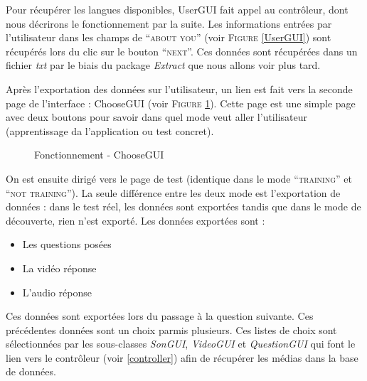Pour récupérer les langues disponibles, UserGUI fait appel au contrôleur, dont nous décrirons le fonctionnement par la suite.
Les informations entrées par l'utilisateur dans les champs de ``\textsc{about you}'' (voir \textsc{Figure} \ref{UserGUI}) sont récupérés lors du clic sur le bouton ``\textsc{next}''. Ces données sont récupérées dans un fichier \textit{txt} par le biais du package \textit{Extract} que nous allons voir plus tard.

Après l'exportation des données sur l'utilisateur, un lien est fait vers la seconde page de l'interface : ChooseGUI (voir \textsc{Figure} \ref{ChooseGUI}). Cette page est une simple page avec deux boutons pour savoir dans quel mode veut aller l'utilisateur (apprentissage da l'application ou test concret).


\begin{figure}[!ht]
\begin{center}
  \caption{Fonctionnement - ChooseGUI}
  \label{ChooseGUI} 
\end{center}
\end{figure}

On est ensuite dirigé vers le page de test (identique dans le mode ``\textsc{training}'' et ``\textsc{not training}''). La seule différence entre les deux mode est l'exportation de données : dans le test réel, les données sont exportées tandis que dans le mode de découverte, rien n'est exporté.
Les données exportées sont :
\begin{itemize}
 \item Les questions posées
 \item La vidéo réponse
 \item L'audio réponse
\end{itemize}
Ces données sont exportées lors du passage à la question suivante.
Ces précédentes données sont un choix parmis plusieurs. Ces listes de choix sont sélectionnées par les sous-classes \textit{SonGUI}, \textit{VideoGUI} et \textit{QuestionGUI} qui font le lien vers le contrôleur (voir \ref{controller}) afin de récupérer les médias dans la base de données.

